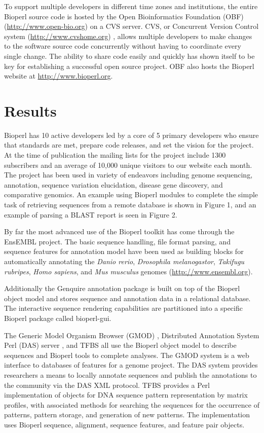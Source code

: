 \documentclass[12pt]{article}
\begin{document}
To support multiple developers in different time zones and
institutions, the entire Bioperl source code is hosted by the Open
Bioinformatics Foundation (OBF) (\url{http://www.open-bio.org}) on a
CVS server.  CVS, or Concurrent Version Control system
(\url{http://www.cvshome.org}) \cite{cvsbook}, allows multiple
developers to make changes to the software source code concurrently
without having to coordinate every single change.  The ability to
share code easily and quickly has shown itself to be key for
establishing a successful open source project.  OBF also hosts the
Bioperl website at \url{http://www.bioperl.org}.

\section{Results}

Bioperl has 10 active developers led by a core of 5 primary developers
who ensure that standards are met, prepare code releases, and set the
vision for the project.  At the time of publication the mailing lists
for the project include 1300 subscribers and an average of 10,000
unique visitors to our website each month.  The project has been used
in variety of endeavors including genome sequencing, annotation,
sequence variation elucidation, disease gene discovery, and
comparative genomics.  An example using Bioperl modules to complete
the simple task of retrieving sequences from a remote database is
shown in Figure 1, and an example of parsing a BLAST report is
seen in Figure 2.

By far the most advanced use of the Bioperl toolkit has come through
the EnsEMBL\cite{ensembl-nar} project.  The basic sequence handling,
file format parsing, and sequence features for annotation model have
been used as building blocks for automatically annotating the
\textit{Danio rerio}, \textit{Drosophila melanogastor},
\textit{Takifugu rubripes}, \textit{Homo sapiens}, and \textit{Mus
musculus} genomes (\url{http://www.ensembl.org}).

Additionally the Genquire \cite{genquire} annotation package is built
on top of the Bioperl object model and stores sequence and annotation
data in a relational database.  The interactive sequence rendering
capabilities are partitioned into a specific Bioperl package called
bioperl-gui.

The Generic Model Organism Browser (GMOD) \cite{gmod}, Distributed
Annotation System Perl (DAS) server \cite{das}, and TFBS
\cite{tfbs} all use the Bioperl object model to describe sequences and
Bioperl tools to complete analyses.  The GMOD system is a web
interface to databases of features for a genome project.  The DAS
system provides researchers a means to locally annotate sequences and
publish the annotations to the community via the DAS XML protocol.
TFBS provides a Perl implementation of objects for DNA sequence pattern
representation by matrix profiles, with associated methods for searching
the sequences for the occurrence of patterns, pattern storage, and
generation of new patterns. The implementation uses Bioperl sequence,
alignment, sequence features, and feature pair objects.
\end{document}
